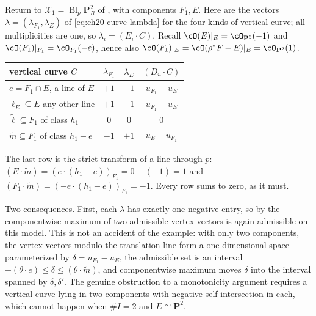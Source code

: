 \begin{example}
\label{ex:ch20-max-fails-naively}
Return to \(\mathcal X_1=\operatorname{Bl}_p\mathbf P^2_R\) of
, with components \(F_1,E\).  Here are the
vectors \(\lambda=(\lambda_{F_1},\lambda_E)\) of
\eqref{eq:ch20-curve-lambda} for the four kinds of vertical curve; all
multiplicities are one, so \(\lambda_i=(E_i\cdot C)\).  Recall
\(\cO(E)|_E=\cO_{\mathbf P^2}(-1)\) and
\(\cO(F_1)|_{F_1}=\cO_{F_1}(-e)\), hence also
\(\cO(F_1)|_E=\cO(\rho^*F-E)|_E=\cO_{\mathbf P^2}(1)\).

\begin{center}
\small
\begin{tabular}{p{}|c|c|c}
\toprule
\textbf{vertical curve \(C\)}&\(\lambda_{F_1}\)&\(\lambda_E\)
 &\((D_u\cdot C)\)\\
\midrule
\(e=F_1\cap E\), a line of \(E\)&\(+1\)&\(-1\)&\(u_{F_1}-u_E\)\\
\(\ell_E\subseteq E\) any other line&\(+1\)&\(-1\)&\(u_{F_1}-u_E\)\\
\(\tilde\ell\subseteq F_1\) of class \(h_1\)&\(0\)&\(0\)&\(0\)\\
\(\tilde m\subseteq F_1\) of class \(h_1-e\)&\(-1\)&\(+1\)&\(u_E-u_{F_1}\)\\
\bottomrule
\end{tabular}
\end{center}

The last row is the strict transform of a line through \(p\):
\((E\cdot\tilde m)=(e\cdot(h_1-e))_{F_1}=0-(-1)=1\) and
\((F_1\cdot\tilde m)=(-e\cdot(h_1-e))_{F_1}=-1\).  Every row sums to zero,
as it must.

Two consequences.  First, each \(\lambda\) has exactly one negative entry,
so by  the componentwise maximum of two
admissible vertex vectors is again admissible on this model.  This is not an
accident of the example: with only two components, the vertex vectors modulo
the translation line form a one-dimensional space parameterized by
\(\delta=u_{F_1}-u_E\), the admissible set is an interval
\(-(\theta\cdot e)\le\delta\le(\theta\cdot\tilde m)\), and componentwise
maximum moves \(\delta\) into the interval spanned by \(\delta,\delta'\).
The genuine obstruction to a monotonicity argument requires a vertical curve
lying in two components with negative self-intersection in each, which
cannot happen when \(\#I=2\) and \(E\cong\mathbf P^2\).


\end{example}
